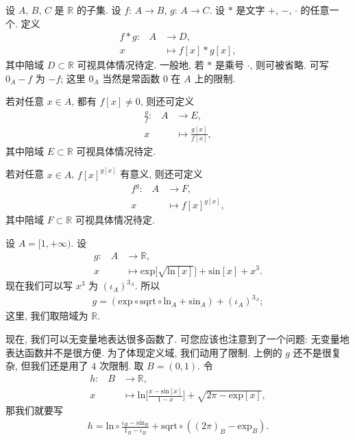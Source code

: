 \begin{definition}
    设 $A$, $B$, $C$ 是 $\mathbb{R}$ 的子集.
    设 $f$: $A \to B$, $g$: $A \to C$.
    设 $\ast$ 是文字 $+$, $-$, $\cdot$ 的任意一个.
    定义
    \begin{align*}
        \text{$f \ast g$:} \quad
        A & \to D,                  \\
        x & \mapsto f[x] \ast g[x],
    \end{align*}
    其中陪域 $D \subset \mathbb{R}$ 可视具体情况待定.
    一般地, 若 $\ast$ 是乘号 $\cdot$, 则可被省略.
    可写 $0_A - f$ 为 $-f$;
    这里 $0_A$ 当然是常函数 $0$ 在 $A$ 上的限制.

    若对任意 $x \in A$, 都有 $f[x] \neq 0$, 则还可定义
    \begin{align*}
        \text{$\frac{g}{f}$:} \quad
        A & \to E,                     \\
        x & \mapsto \frac{g[x]}{f[x]},
    \end{align*}
    其中陪域 $E \subset \mathbb{R}$ 可视具体情况待定.

    若对任意 $x \in A$, ${f[x]}^{g[x]}$ 有意义, 则还可定义
    \begin{align*}
        \text{${f}^{g}$:} \quad
        A & \to F,                 \\
        x & \mapsto {f[x]}^{g[x]},
    \end{align*}
    其中陪域 $F \subset \mathbb{R}$ 可视具体情况待定.
\end{definition}

\begin{example}
    设 $A = [1, +\infty)$. 设
    \begin{align*}
        \text{$g$:} \quad
        A & \to \mathbb{R},                                                                           \\
        x & \mapsto \mathrm{exp} {\bigg[ \sqrt{\mathrm{ln} {[x]}} \bigg]} + \mathrm{sin} {[x]} + x^3.
    \end{align*}
    现在我们可以写 $x^3$ 为 ${(\iota_A)}^{3_A}$.
    所以
    \begin{align*}
        g = (\mathrm{exp} \circ \mathrm{sqrt} \circ \mathrm{ln}_{A} + \mathrm{sin}_{A}) + {(\iota_A)}^{3_A};
    \end{align*}
    这里, 我们取陪域为 $\mathbb{R}$.
\end{example}

现在, 我们可以无变量地表达很多函数了.
可您应该也注意到了一个问题:
无变量地表达函数并不是很方便.
为了体现定义域, 我们动用了限制.
上例的 $g$ 还不是很复杂, 但我们还是用了 $4$ 次限制.
取 $B = (0, 1)$.
令
\begin{align*}
    \text{$h$:} \quad
    B & \to \mathbb{R},                                                                                              \\
    x & \mapsto \mathrm{ln} {\bigg[ \frac{x - \mathrm{sin} {[x]}}{1 - x} \bigg]} + \sqrt{2\pi - \mathrm{exp} {[x]}},
\end{align*}
那我们就要写
\begin{align*}
    h
    = \mathrm{ln} \circ \frac{\iota_B - \mathrm{sin}_B}{1_B - \iota_B}
    + \mathrm{sqrt} \circ ((2\pi)_B - \mathrm{exp}_B).
\end{align*}

